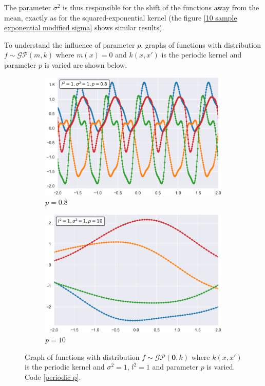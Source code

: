 The parameter $\sigma^2$ is thus responsible for the shift of the functions away from the mean, exactly as for the squared-exponential kernel (the figure \ref{10 sample exponential modified sigma} shows similar results).


\newpage

To understand the influence of parameter $p$, graphs of functions with distribution $f\sim \mathcal{GP}(m,k)$ where $m(x)=0$ and $k(x,x')$ is the periodic kernel and parameter $p$ is varied are shown below.

\begin{figure}[h]
\centering
\begin{subfigure}{.5\textwidth}
  \centering
  \includegraphics[width=\linewidth]{images/Gaussian process/Periodic - p=08.pdf}
  \caption{$p=0.8$}
\end{subfigure}%
\begin{subfigure}{.5\textwidth}
  \centering
  \includegraphics[width=\linewidth]{images/Gaussian process/Periodic - p=10.pdf}
  \caption{$p=10$}
\end{subfigure}
\caption{Graph of functions with distribution  $f\sim \mathcal{GP}(\bm{0},k)$ where $k(x,x')$ is the periodic kernel and $\sigma^2=1$, $l^2=1$ and parameter $p$ is varied. Code \ref{periodic p}.}
\label{10 sample periodic modified p}
\end{figure}


